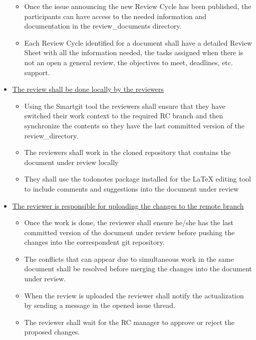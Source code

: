 \documentclass{template/openetcs_article}
\begin{document}
\begin{itemize}
\begin{itemize}
\item Once the issue announcing the new Review Cycle has been published, the participants can have access to the needed information and documentation in the review\_documents directory.
\item Each Review Cycle identified for a document shall have a detailed Review Sheet with all the information needed, the tasks assigned when there is not an open a general review, the objectives to meet, deadlines, etc. support.
\end{itemize}

\item \underline{The review shall be done locally by the reviewers}
\begin{itemize}
\item Using the Smartgit tool the reviewers shall ensure that they have switched their work context to the required RC branch and then synchronize the contents so they have the last committed version of the review\_directory.
\item The reviewers shall work in the cloned repository that contains the document under review locally 
\item They shall use the todonotes package installed for the LaTeX editing tool to include comments and suggestions into the document under review
\end{itemize}

\item \underline{The reviewer is responsible for uploading the changes to the remote branch}
\begin{itemize}
\item Once the work is done, the reviewer shall ensure he/she has the last committed version of the document under review before pushing the changes into the correspondent git repository. 
\item The conflicts that can appear due to simultaneous work in the same document shall be resolved before merging the changes into the document under review. 
\item When the review is uploaded the reviewer shall notify the actualization by sending a message in the opened issue thread.
\item The reviewer shall wait for the RC manager to approve or reject the proposed changes.
\end{itemize}


\end{itemize}
\end{document}
